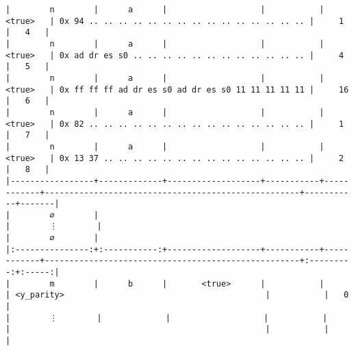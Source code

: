 \documentclass[varwidth=\maxdimen,margin=0.5cm,multi={verbatim}]{standalone}
\begin{document}
\begin{verbatim}
|        n        |      a      |                   |           |   <true>   | 0x 94 .. .. .. .. .. .. .. .. .. .. .. .. .. .. .. |     1     |   4   |
|        n        |      a      |                   |           |   <true>   | 0x ad dr es s0 .. .. .. .. .. .. .. .. .. .. .. .. |     4     |   5   |
|        n        |      a      |                   |           |   <true>   | 0x ff ff ff ad dr es s0 ad dr es s0 11 11 11 11 11 |     16    |   6   |
|        n        |      a      |                   |           |   <true>   | 0x 82 .. .. .. .. .. .. .. .. .. .. .. .. .. .. .. |     1     |   7   |
|        n        |      a      |                   |           |   <true>   | 0x 13 37 .. .. .. .. .. .. .. .. .. .. .. .. .. .. |     2     |   8   |
|-----------------+-------------+-------------------+-----------+------------+----------------------------------------------------+-----------+-------|
|        ∅        |
|        ⋮        |
|        ∅        |
|:---------------:+:-----------:+-------------------+-----------+------------+----------------------------------------------------+:---------:+:-----:|
|        m        |      b      |       <true>      |           |            | <y_parity>                                         |           |   0   |
|        ⋮        |             |                   |           |            |                                                    |           |       |

\end{verbatim}
\end{document}
